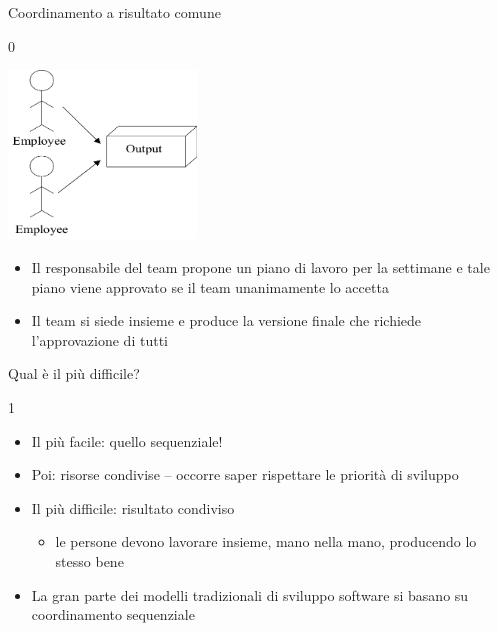 \documentclass{beamer}
\begin{document}
\begin{frame}{\centerline{Coordinamento a risultato comune}}
0
\begin{center}
\includegraphics[width=50mm]{A2022.IDSEPC.ProcessoDiProduzione/img-img13.png}
\end{center}

\begin{itemize}
\item  Il responsabile del team propone un piano di lavoro per la settimane e tale piano viene approvato se il team unanimamente lo accetta

\item Il team si siede insieme e produce la versione finale che richiede l'approvazione di tutti

  
\end{itemize}


\end{frame}

\begin{frame}{\centerline{Qual \`{e} il pi\`{u} difficile?}}
1
\begin{itemize}

\item  Il pi\`{u} facile: quello sequenziale!
\item  Poi: risorse condivise -- occorre saper rispettare le priorit\`{a} di sviluppo
\item  Il pi\`{u} difficile: risultato condiviso
\begin{itemize}

\item  le persone devono lavorare insieme, mano nella mano, producendo lo stesso bene
\end{itemize}

\item La gran parte dei modelli tradizionali di sviluppo software si basano su coordinamento sequenziale

\end{itemize}

\end{frame}
\end{document}
